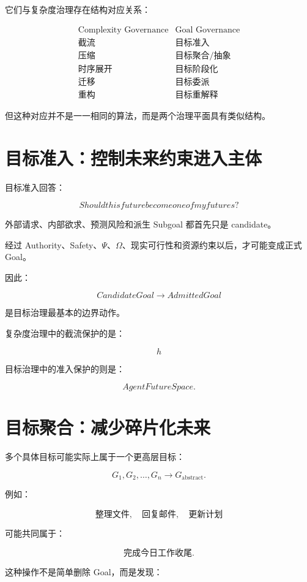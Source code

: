 它们与复杂度治理存在结构对应关系：

\[
\begin{array}{c|c}
\text{Complexity Governance}
&
\text{Goal Governance}
\\
\hline
\text{截流}
&
\text{目标准入}
\\
\text{压缩}
&
\text{目标聚合/抽象}
\\
\text{时序展开}
&
\text{目标阶段化}
\\
\text{迁移}
&
\text{目标委派}
\\
\text{重构}
&
\text{目标重解释}
\end{array}
\]

但这种对应并不是一一相同的算法，而是两个治理平面具有类似结构。


\section{目标准入：控制未来约束进入主体}

目标准入回答：

\[
\boxed{
Should this future become one of my futures?
}
\]

外部请求、内部欲求、预测风险和派生 Subgoal 都首先只是 candidate。

经过 Authority、Safety、$\Psi$、$\Omega$、现实可行性和资源约束以后，才可能变成正式 Goal。

因此：

\[
CandidateGoal
\rightarrow
AdmittedGoal
\]

是目标治理最基本的边界动作。

复杂度治理中的截流保护的是：

\[
h
\]

目标治理中的准入保护的则是：

\[
\boxed{
AgentFutureSpace.
}
\]


\section{目标聚合：减少碎片化未来}

多个具体目标可能实际上属于一个更高层目标：

\[
G_1,G_2,\dots,G_n
\rightarrow
G_{\mathrm{abstract}}.
\]

例如：

\[
\text{整理文件},
\quad
\text{回复邮件},
\quad
\text{更新计划}
\]

可能共同属于：

\[
\text{完成今日工作收尾}.
\]

这种操作不是简单删除 Goal，而是发现：

